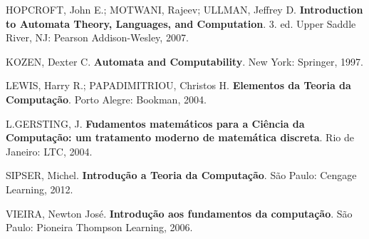\documentclass[
  brazilian,
  letterpaper,
]{book}
\newlength{\cslhangindent}
\newenvironment{CSLReferences}[2] %
 {\begin{list}{}{%
  \setlength{\itemindent}{0pt}
  \setlength{\leftmargin}{0pt}
  \setlength{\parsep}{0pt}
  \ifodd #1
   \setlength{\leftmargin}{\cslhangindent}
   \setlength{\itemindent}{-1\cslhangindent}
  \fi
  \setlength{\itemsep}{#2\baselineskip}}}
 {\end{list}}
\theoremstyle{plain}
\theoremstyle{definition}
\theoremstyle{remark}
\begin{document}
\label{refs}
\begin{CSLReferences}{0}{1}
HOPCROFT, John E.; MOTWANI, Rajeev; ULLMAN, Jeffrey D.
\textbf{Introduction to Automata Theory, Languages, and Computation}. 3.
ed. Upper Saddle River, NJ: Pearson Addison-Wesley, 2007.

KOZEN, Dexter C. \textbf{Automata and Computability}. New York:
Springer, 1997.

LEWIS, Harry R.; PAPADIMITRIOU, Christos H. \textbf{Elementos da Teoria
da Computação}. Porto Alegre: Bookman, 2004.

L.GERSTING, J. \textbf{Fudamentos matemáticos para a Ciência da
Computação: um tratamento moderno de matemática discreta}. Rio de
Janeiro: LTC, 2004.

SIPSER, Michel. \textbf{Introdução a Teoria da Computação}. São Paulo:
Cengage Learning, 2012.

VIEIRA, Newton José. \textbf{Introdução aos fundamentos da computação}.
São Paulo: Pioneira Thompson Learning, 2006.

\end{CSLReferences}


\backmatter
\end{document}
